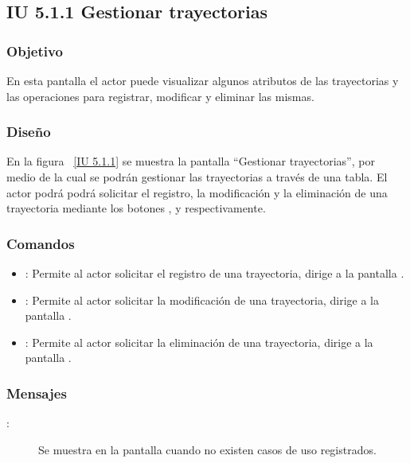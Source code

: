 \subsection{IU 5.1.1 Gestionar trayectorias}
\subsubsection{Objetivo}
	
	En esta pantalla el actor puede visualizar algunos atributos de las trayectorias y las operaciones para registrar, modificar y eliminar las mismas.

\subsubsection{Diseño}

    En la figura ~\ref{IU 5.1.1} se muestra la pantalla ``Gestionar trayectorias'', por medio de la cual 
    se podrán gestionar las trayectorias a través de una tabla.
    El actor podrá podrá solicitar el registro, la modificación y la eliminación de una trayectoria mediante los botones
    , \btnEditar y \btnEliminar respectivamente. \\
    



\subsubsection{Comandos}
\begin{itemize}
	\item {}: Permite al actor solicitar el registro de una trayectoria, dirige a la pantalla .
	\item \btnEditar[Modificar]: Permite al actor solicitar la modificación de una trayectoria, dirige a la pantalla .
	\item \btnEliminar[Eliminar]: Permite al actor solicitar la eliminación de una trayectoria, dirige a la pantalla .
\end{itemize}

\subsubsection{Mensajes}

	
\begin{description}
	\item[:] Se muestra en la pantalla  cuando no existen casos de uso registrados.
\end{description}
